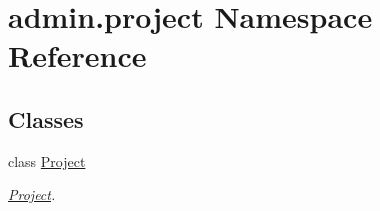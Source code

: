 \hypertarget{namespaceadmin_1_1project}{\section{admin.\-project Namespace Reference}
\label{namespaceadmin_1_1project}
}
\subsection*{Classes}
\begin{DoxyCompactItemize}
\item 
class \hyperlink{classadmin_1_1project_1_1Project}{Project}
\begin{DoxyCompactList}\small\item\em \hyperlink{classadmin_1_1project_1_1Project}{Project}. \end{DoxyCompactList}\end{DoxyCompactItemize}

